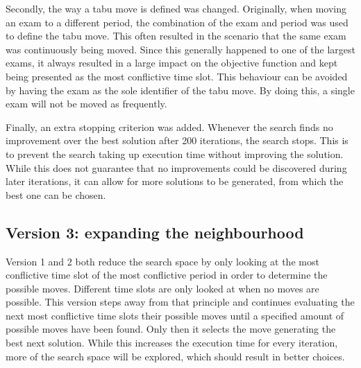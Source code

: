 Secondly, the way a tabu move is defined was changed. Originally, when moving an exam to a different period, the combination of the exam and period was used to define the tabu move. This often resulted in the scenario that the same exam was continuously being moved. Since this generally happened to one of the largest exams, it always resulted in a large impact on the objective function and kept being presented as the most conflictive time slot. This behaviour can be avoided by having the exam as the sole identifier of the tabu move. By doing this, a single exam will not be moved as frequently.

Finally, an extra stopping criterion was added. Whenever the search finds no improvement over the best solution after 200 iterations, the search stops. This is to prevent the search taking up execution time without improving the solution. While this does not guarantee that no improvements could be discovered during later iterations, it can allow for more solutions to be generated, from which the best one can be chosen.
\subsection{Version 3: expanding the neighbourhood} \label{version3}

Version 1 and 2 both reduce the search space by only looking at the most conflictive time slot of the most conflictive period in order to determine the possible moves. Different time slots are only looked at when no moves are possible. This version steps away from that principle and continues evaluating the next most conflictive time slots their possible moves until a specified amount of possible moves have been found. Only then it selects the move generating the best next solution. While this increases the execution time for every iteration, more of the search space will be explored, which should result in better choices.



